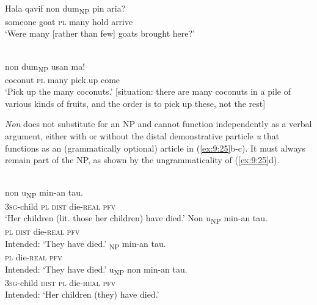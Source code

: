 \ea%
\label{ex:9:23}
 \\
\gll Hala {\ob}{qavif} non {dum}{\cb}\textsubscript{\upshape NP} pin aria{{\textglotstop}}{?} \\
  someone goat \textsc{pl} many hold arrive   \\
\glt `Were many [rather than few] goats brought here?'
\z







\ea%
\label{ex:9:24}
 \\
 non {dum}{\cb}\textsubscript{\upshape NP} usan ma! \\
  coconut \textsc{pl} many pick.up come  \\
\glt `Pick up the many coconuts.' [situation: there are many coconuts in a pile of various kinds of fruits, and the order is to pick up these, not the rest]
\z






\textit{Non} does not substitute for an NP and cannot function independently as a verbal argument, either with or without the distal demonstrative particle \textit{u} that functions as an (grammatically optional) article in (\ref{ex:9:25}b-c). It must always remain part of the NP, as shown by the ungrammaticality of (\ref{ex:9:25}d).


\ea%
\label{ex:9:25}
 \\
\ea
{}   non u{\cb}\textsubscript{\upshape NP} min-an tau. \\
   \textsc{3sg}-child \textsc{pl} \textsc{dist} die-\textsc{real} \textsc{pfv} \\
\glt `Her children (lit. those her children) have died.'
\ex
\gll *{\ob}Non u{\cb}\textsubscript{\upshape NP} min-an tau. \\
   \textsc{pl} \textsc{dist} die-\textsc{real} \textsc{pfv} \\
\glt  Intended: `They have died.'
\ex
{}\textsubscript{\upshape NP} min-an tau. \\
    \textsc{pl} die-\textsc{real} \textsc{pfv} \\
\glt  Intended: `They have died.'
\ex
{}   {u}{\cb}\textsubscript{\upshape NP} non min-an tau. \\
  \textsc{3sg}-child \textsc{dist} \textsc{pl} die-\textsc{real} \textsc{pfv}  \\
\glt  Intended: `Her children (they) have died.'
\z
\z






